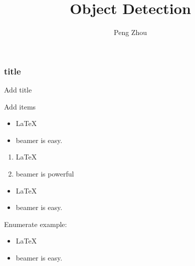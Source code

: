 \documentclass{beamer}
\begin{document}
\title{Object Detection}
\author{Peng Zhou}
\maketitle{}

\begin{frame}
  \frametitle{title}
Add title
\end{frame}

\begin{frame}
Add items
  \begin{itemize}
  \item \LaTeX{}
  \item beamer is easy.
  \end{itemize}

  \begin{enumerate}
  \item \LaTeX{}
  \item beamer is powerful
  \end{enumerate}
\end{frame}

\begin{frame}

  \begin{example}
    \begin{itemize}
    \item \LaTeX{}
    \item beamer is easy.
    \end{itemize}    
  \end{example}
\end{frame}


\begin{frame}
  \begin{exampleblock}{Enumerate example:}
    \begin{itemize}
    \item \LaTeX{}
    \item beamer is easy.
    \end{itemize}    
  \end{exampleblock}
\end{frame}
\end{document}

